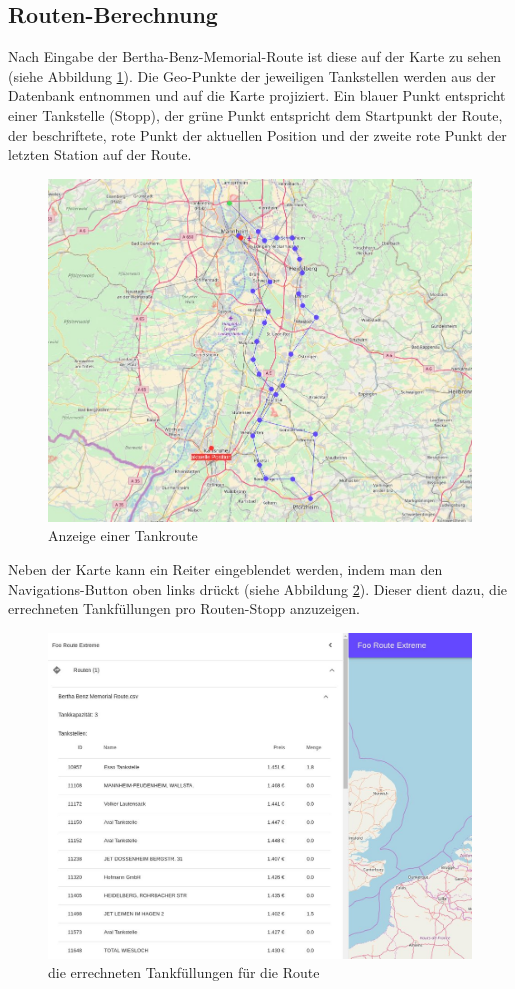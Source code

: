 \documentclass[
ngerman          %
,a4paper          %
,11pt
,pdftex
]{report}
\begin{document}
\subsection{Routen-Berechnung}
Nach Eingabe der Bertha-Benz-Memorial-Route ist diese auf der Karte zu sehen (siehe Abbildung \ref{fig:install4}). Die Geo-Punkte der jeweiligen Tankstellen werden aus der Datenbank entnommen und auf die Karte projiziert. Ein blauer Punkt entspricht einer Tankstelle (Stopp), der grüne Punkt entspricht dem Startpunkt der Route, der beschriftete, rote Punkt der aktuellen Position und der zweite rote Punkt der letzten Station auf der Route.
\begin{figure}[H]
\centering
\includegraphics[width=0.6\linewidth]{install4.jpg}
\caption{Anzeige einer Tankroute}
\label{fig:install4}
\end{figure}
Neben der Karte kann ein Reiter eingeblendet werden, indem man den Navigations-Button oben links drückt (siehe Abbildung \ref{fig:install5}). Dieser dient dazu, die errechneten Tankfüllungen pro Routen-Stopp anzuzeigen.
\begin{figure}[H]
\centering
\includegraphics[width=0.8\linewidth]{install5.jpg}
\caption{die errechneten Tankfüllungen für die Route}
\label{fig:install5}
\end{figure}
\end{document}
